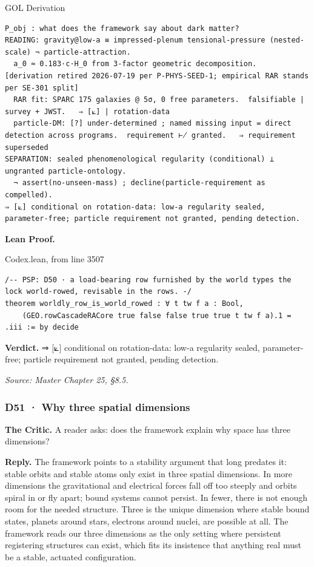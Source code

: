 \documentclass[10pt,twocolumn]{article}
\begin{document}
\begin{golbox}{GOL Derivation}
\begin{lstlisting}[style=golv]
P_obj : what does the framework say about dark matter?
READING: gravity@low-a ≡ impressed-plenum tensional-pressure (nested-scale) ¬ particle-attraction.
  a_0 ≈ 0.183·c·H_0 from 3-factor geometric decomposition.  [derivation retired 2026-07-19 per P-PHYS-SEED-1; empirical RAR stands per SE-301 split]
  RAR fit: SPARC 175 galaxies @ 5σ, 0 free parameters.  falsifiable | survey + JWST.   ⇒ [⟀] | rotation-data
  particle-DM: [?] under-determined ; named missing input = direct detection across programs.  requirement ⊬ granted.   ⇒ requirement superseded
SEPARATION: sealed phenomenological regularity (conditional) ⊥ ungranted particle-ontology.
  ¬ assert(no-unseen-mass) ; decline(particle-requirement as compelled).
⇒ [⟀] conditional on rotation-data: low-a regularity sealed, parameter-free; particle requirement not granted, pending detection.
\end{lstlisting}
\end{golbox}

\textbf{Lean Proof.}

\begin{leanexcerpt}{Codex.lean, from line 3507}
\begin{lstlisting}[style=leanx,firstnumber=3507]
/-- PSP: D50 · a load-bearing row furnished by the world types the lock world-rowed, revisable in the rows. -/
theorem worldly_row_is_world_rowed : ∀ t tw f a : Bool,
    (GEO.rowCascadeRACore true false false true true t tw f a).1 = .iii := by decide
\end{lstlisting}
\end{leanexcerpt}

\textbf{Verdict.} ⇒ {[}⟀{]} conditional on rotation-data: low-a
regularity sealed, parameter-free; particle requirement not granted,
pending detection.

\emph{Source: Master Chapter 25, §8.5.}

\hypertarget{d51-why-three-spatial-dimensions}{%
\subsubsection{D51 · Why three spatial
dimensions}\label{d51-why-three-spatial-dimensions}}

\textbf{The Critic.} A reader asks: does the framework explain why space
has three dimensions?

\textbf{Reply.} The framework points to a stability argument that long
predates it: stable orbits and stable atoms only exist in three spatial
dimensions. In more dimensions the gravitational and electrical forces
fall off too steeply and orbits spiral in or fly apart; bound systems
cannot persist. In fewer, there is not enough room for the needed
structure. Three is the unique dimension where stable bound states,
planets around stars, electrons around nuclei, are possible at all. The
framework reads our three dimensions as the only setting where
persistent registering structures can exist, which fits its insistence
that anything real must be a stable, actuated configuration.
\end{document}
